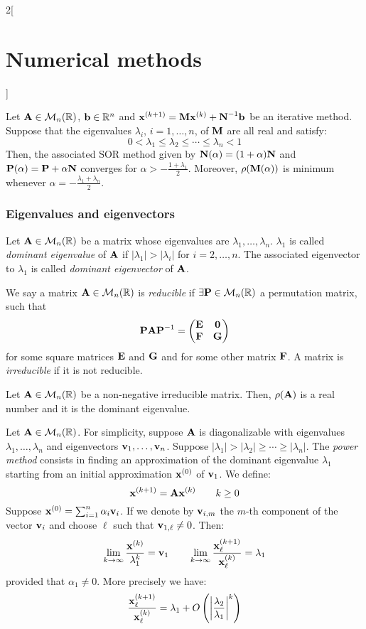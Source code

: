 \documentclass[../../../main_math.tex]{subfiles}
\begin{document}
\begin{multicols}{2}[\section{Numerical methods}]
  \begin{theorem}
    Let $\boldsymbol{\mathrm{A}}\in\mathcal{M}_n(\mathbb{R})$, $\boldsymbol{\mathrm{b}}\in\mathbb{R}^n$ and $\boldsymbol{\mathrm{x}}^{(k+1)}=\boldsymbol{\mathrm{M}}\boldsymbol{\mathrm{x}}^{(k)}+\boldsymbol{\mathrm{N}}^{-1}\boldsymbol{\mathrm{b}}$ be an iterative method. Suppose that the eigenvalues $\lambda_i$, $i=1,\ldots,n$, of $\boldsymbol{\mathrm{M}}$ are all real and satisfy: $$0<\lambda_1\leq\lambda_2\leq\cdots\leq\lambda_n<1$$
    Then, the associated SOR method given by $\boldsymbol{\mathrm{N}}(\alpha)=(1+\alpha)\boldsymbol{\mathrm{N}}$ and $\boldsymbol{\mathrm{P}}(\alpha)=\boldsymbol{\mathrm{P}}+\alpha\boldsymbol{\mathrm{N}}$ converges for $\alpha>-\frac{1+\lambda_1}{2}$. Moreover, $\rho(\boldsymbol{\mathrm{M}}(\alpha))$ is minimum whenever $\alpha=-\frac{\lambda_1+\lambda_n}{2}$.
  \end{theorem}
  \subsubsection{Eigenvalues and eigenvectors}
  \begin{definition}
    Let $\boldsymbol{\mathrm{A}}\in\mathcal{M}_n(\mathbb{R})$ be a matrix whose eigenvalues are $\lambda_1,\ldots,\lambda_n$. $\lambda_1$ is called \emph{dominant eigenvalue} of $\boldsymbol{\mathrm{A}}$ if $|\lambda_1|>|\lambda_i|$ for $i=2,\ldots,n$. The associated eigenvector to $\lambda_1$ is called \emph{dominant eigenvector} of $\boldsymbol{\mathrm{A}}$.
  \end{definition}
  \begin{definition}
    We say a matrix $\boldsymbol{\mathrm{A}}\in\mathcal{M}_n(\mathbb{R})$ is \emph{reducible} if $\exists\boldsymbol{\mathrm{P}}\in\mathcal{M}_n(\mathbb{R})$ a permutation matrix, such that $$\boldsymbol{\mathrm{P}}\boldsymbol{\mathrm{A}}\boldsymbol{\mathrm{P}}^{-1}=
      \begin{pmatrix}
        \boldsymbol{\mathrm{E}} & \boldsymbol{\mathrm{0}} \\
        \boldsymbol{\mathrm{F}} & \boldsymbol{\mathrm{G}}
      \end{pmatrix}$$ for some square matrices $\boldsymbol{\mathrm{E}}$ and $\boldsymbol{\mathrm{G}}$ and for some other matrix $\boldsymbol{\mathrm{F}}$. A matrix is \emph{irreducible} if it is not reducible.
  \end{definition}
  \begin{theorem}
    Let $\boldsymbol{\mathrm{A}}\in\mathcal{M}_n(\mathbb{R})$ be a non-negative irreducible matrix. Then, $\rho(\boldsymbol{\mathrm{A}})$ is a real number and it is the dominant eigenvalue.
  \end{theorem}
  \begin{method}
    Let $\boldsymbol{\mathrm{A}}\in\mathcal{M}_n(\mathbb{R})$. For simplicity, suppose $\boldsymbol{\mathrm{A}}$ is diagonalizable with eigenvalues $\lambda_1,\ldots,\lambda_n$ and eigenvectors $\boldsymbol{\mathrm{v}}_1,\ldots,\boldsymbol{\mathrm{v}}_n$. Suppose $|\lambda_1|>|\lambda_2|\geq\cdots\geq|\lambda_n|$. The \emph{power method} consists in finding an approximation of the dominant eigenvalue $\lambda_1$ starting from an initial approximation $\boldsymbol{\mathrm{x}}^{(0)}$ of $\boldsymbol{\mathrm{v}}_1$. We define: $$\boldsymbol{\mathrm{x}}^{(k+1)}=\boldsymbol{\mathrm{A}}\boldsymbol{\mathrm{x}}^{(k)}\qquad k\geq 0$$ Suppose $\boldsymbol{\mathrm{x}}^{(0)}=\sum_{i=1}^n\alpha_i\boldsymbol{\mathrm{v}}_i$. If we denote by $\boldsymbol{\mathrm{v}}_{i,m}$ the $m$-th component of the vector $\boldsymbol{\mathrm{v}}_i$ and choose $\ell$ such that $\boldsymbol{\mathrm{v}}_{1,\ell}\ne0$. Then: $$\lim_{k\to\infty}\frac{\boldsymbol{\mathrm{x}}^{(k)}}{\lambda_1^k}=\boldsymbol{\mathrm{v}}_1\qquad\lim_{k\to\infty}\frac{\boldsymbol{\mathrm{x}}_\ell^{(k+1)}}{\boldsymbol{\mathrm{x}}_\ell^{(k)}}=\lambda_1$$ provided that $\alpha_1\ne0$. More precisely we have: $$\frac{\boldsymbol{\mathrm{x}}_\ell^{(k+1)}}{\boldsymbol{\mathrm{x}}_\ell^{(k)}}=\lambda_1+O\left(\left|\frac{\lambda_2}{\lambda_1}\right|^k\right)$$

\end{method}
\end{multicols}
\end{document}
